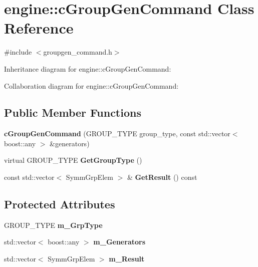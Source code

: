 \hypertarget{classengine_1_1cGroupGenCommand}{\section{engine\-:\-:c\-Group\-Gen\-Command Class Reference}
\label{classengine_1_1cGroupGenCommand}
}


{\ttfamily \#include $<$groupgen\-\_\-command.\-h$>$}



Inheritance diagram for engine\-:\-:c\-Group\-Gen\-Command\-:


Collaboration diagram for engine\-:\-:c\-Group\-Gen\-Command\-:
\subsection*{Public Member Functions}
\begin{DoxyCompactItemize}
\item 
\hypertarget{classengine_1_1cGroupGenCommand_a94d3c632e772f19a07dfb15a4d46a0d4}{{\bfseries c\-Group\-Gen\-Command} (G\-R\-O\-U\-P\-\_\-\-T\-Y\-P\-E group\-\_\-type, const std\-::vector$<$ boost\-::any $>$ \&generators)}\label{classengine_1_1cGroupGenCommand_a94d3c632e772f19a07dfb15a4d46a0d4}

\item 
\hypertarget{classengine_1_1cGroupGenCommand_a03e3bb5ffb5b1b53bac6a97d9562db50}{virtual G\-R\-O\-U\-P\-\_\-\-T\-Y\-P\-E {\bfseries Get\-Group\-Type} ()}\label{classengine_1_1cGroupGenCommand_a03e3bb5ffb5b1b53bac6a97d9562db50}

\item 
\hypertarget{classengine_1_1cGroupGenCommand_a508e5a05d72dcfc34c1bb9859b901a97}{const std\-::vector$<$ Symm\-Grp\-Elem $>$ \& {\bfseries Get\-Result} () const }\label{classengine_1_1cGroupGenCommand_a508e5a05d72dcfc34c1bb9859b901a97}

\end{DoxyCompactItemize}
\subsection*{Protected Attributes}
\begin{DoxyCompactItemize}
\item 
\hypertarget{classengine_1_1cGroupGenCommand_ab878cfec34e06b0768f6efdbf9deb9fa}{G\-R\-O\-U\-P\-\_\-\-T\-Y\-P\-E {\bfseries m\-\_\-\-Grp\-Type}}\label{classengine_1_1cGroupGenCommand_ab878cfec34e06b0768f6efdbf9deb9fa}

\item 
\hypertarget{classengine_1_1cGroupGenCommand_acff9a3269f987eadf5b39412c09fe497}{std\-::vector$<$ boost\-::any $>$ {\bfseries m\-\_\-\-Generators}}\label{classengine_1_1cGroupGenCommand_acff9a3269f987eadf5b39412c09fe497}

\item 
\hypertarget{classengine_1_1cGroupGenCommand_a82938b2e1e2254bbecd5862d75025834}{std\-::vector$<$ Symm\-Grp\-Elem $>$ {\bfseries m\-\_\-\-Result}}\label{classengine_1_1cGroupGenCommand_a82938b2e1e2254bbecd5862d75025834}

\end{DoxyCompactItemize}



